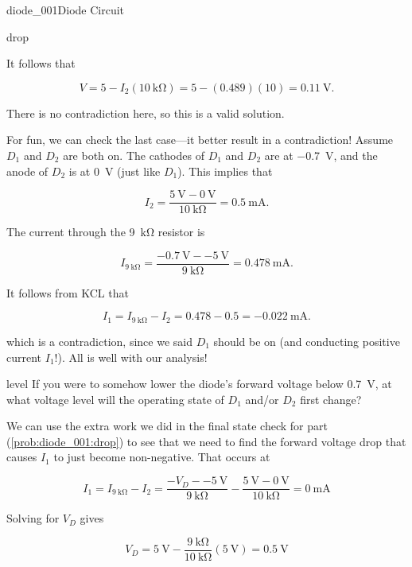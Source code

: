 \begin{mainquestion}{diode_001}{Diode Circuit}
\begin{partquestion}{drop}
\begin{answer}
It follows that

\[
V
=
5
-
I_2\left(\qty{10}{\kilo\ohm}\right)
=
5
-
(0.489)\left(10\right)
=
\qty{0.11}{\volt}.
\]

There is no contradiction here, so this is a valid solution.

For fun, we can check the last case—it better result in a contradiction! Assume $D_1$ and $D_2$ are both on. The cathodes of $D_1$ and $D_2$ are at \qty{-0.7}{\volt}, and the anode of $D_2$ is at \qty{0}{\volt} (just like $D_1$). This implies that

\[
I_2
=
\frac{\qty{5}{\volt}-\qty{0}{\volt}}
{\qty{10}{\kilo\ohm}}
=
\qty{0.5}{\milli\ampere}.
\]

The current through the \qty{9}{\kilo\ohm} resistor is

\[
I_{\qty{9}{\kilo\ohm}}
=
\frac{\qty{-0.7}{\volt}-\qty{-5}{\volt}}
{\qty{9}{\kilo\ohm}}
=
\qty{0.478}{\milli\ampere}.
\]

It follows from KCL that

\[
I_1
=
I_{\qty{9}{\kilo\ohm}}-I_2
=
0.478-0.5
=
\qty{-0.022}{\milli\ampere}.
\]

which is a contradiction, since we said $D_1$ should be on (and conducting positive current $I_1$!). All is well with our analysis!
\end{answer}
\end{partquestion}

\begin{partquestion}{level}
{If you were to somehow lower the diode’s forward voltage below \qty{0.7}{\volt}, at what voltage level will the operating state of $D_1$ and/or $D_2$ first change?}

\begin{answer}
We can use the extra work we did in the final state check for part (\cref{prob:diode_001:drop}) to see that we need to find the forward voltage drop that causes $I_1$ to just become non-negative. That occurs at

\[
I_1
=
I_{\qty{9}{\kilo\ohm}}
-
I_2
=
\frac{-V_D-\qty{-5}{\volt}}{\qty{9}{\kilo\ohm}}
-
\frac{\qty{5}{\volt}-\qty{0}{\volt}}{\qty{10}{\kilo\ohm}}
=
\qty{0}{\milli\ampere}
\]

Solving for $V_D$ gives

\[
V_D
=
\qty{5}{\volt}
-
\frac{\qty{9}{\kilo\ohm}}{\qty{10}{\kilo\ohm}}
\left(\qty{5}{\volt}\right)
=
\qty{0.5}{\volt}
\]
\end{answer}
\end{partquestion}


\end{mainquestion}
